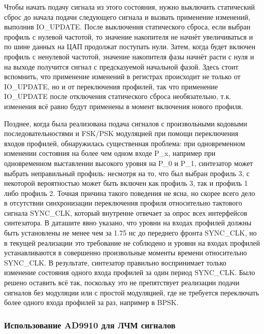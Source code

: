 \documentclass[rusmathsym, eqnumwithinsec, amspack, hyperref]{bomgost}
\begin{document}
Чтобы начать подачу сигнала из этого состояния, нужно выключить статический сброс до начала подачи следующего сигнала и вызвать применение изменений, выполнив IO\_UPDATE. После выключения статического сброса, если выбран профиль с нулевой частотой, то значение накопителя не начнёт увеличиваться и по шине данных на ЦАП продолжат поступать нули. Затем, когда будет включен профиль с ненулевой частотой, значение накопителя фазы начнёт расти с нуля и на выходе получится сигнал с предсказуемой начальной фазой. Здесь стоит вспомнить, что применение изменений в регистрах происходит не только от IO\_UPDATE, но и от переключения профилей, так что применение IO\_UPDATE после отключения статического сброса необязательно, т.к. изменения всё равно будут применены в момент включения нового профиля.

Позднее, когда была реализована подача сигналов с произвольными кодовыми последовательностями и FSK/PSK модуляцией при помощи переключения входов профилей, обнаружилась существенная проблема: при одновременном изменении состояния на более чем одном входе P\_x, например при одновременном выставлении высокого уровня на P\_0 и P\_1, синтезатор может выбрать неправильный профиль: несмотря на то, что был выбран профиль 3, с некоторой вероятностью может быть включен как профиль 3, так и профиль 1 либо профиль 2. Точная причина такого поведения не ясна, но скорее всего дело в отсутствии синхронизации переключения профиля относительно тактового сигнала SYNC\_CLK, который внутренне отвечает за опрос всех интерфейсов синтезатора. В даташите явно указано, что уровни на входах профилей должны быть установлены не менее чем за 1.75 нс до переднего фронта SYNC\_CLK, но в текущей реализации это требование не соблюдено и уровни на входах профилей устанавливаются в совершенно произвольные моменты времени относительно SYNC\_CLK. В результате, синтезатор правильно воспринимает только изменение состояния одного входа профилей за один период SYNC\_CLK. Было решено оставить всё так, поскольку это не препятствует реализации подачи сигналов без модуляции или с простой модуляцией, где не требуется переключать более одного входа профилей за раз, например в BPSK.

\subsubsection{Использование AD9910 для ЛЧМ сигналов}
\end{document}
